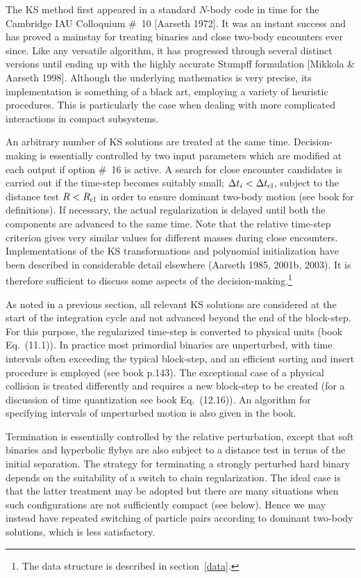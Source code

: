 \documentclass[12pt]{article}
\begin{document}
The KS method first appeared in a standard $N$-body code in time for the
Cambridge IAU Colloquium \#~10 [Aarseth 1972].
It was an instant success and has proved a mainstay for treating binaries
and close two-body encounters ever since.
Like any versatile algorithm, it has progressed through several distinct
versions until ending up with the highly accurate Stumpff formulation
[Mikkola \& Aarseth 1998].
Although the underlying mathematics is very precise, its implementation is
something of a black art, employing a variety of heuristic procedures.
This is particularly the case when dealing with more complicated interactions
in compact subsystems.

An arbitrary number of KS solutions are treated at the same time.
Decision-making is essentially controlled by two input parameters which are
modified at each output if option \#~16 is active.
A search for close encounter candidates is carried out if the time-step
becomes suitably small; \ie ${\Delta t}_i < {\Delta t}_{\rm cl}$,
subject to the distance test $R < R_{\rm cl}$ in order to ensure dominant
two-body motion (see book for definitions).
If necessary, the actual regularization is delayed until both the components
are advanced to the same time.
Note that the relative time-step criterion gives very similar values for
different masses during close encounters.
Implementations of the KS transformations and polynomial initialization have
been described in considerable detail elsewhere (Aarseth 1985, 2001b, 2003).
It is therefore sufficient to discuss some aspects of the
decision-making.\footnote{The data structure is described in
section~\ref{data}.}

As noted in a previous section, all relevant KS solutions are considered
at the start of the integration cycle and not advanced beyond the end of the
block-step.
For this purpose, the regularized time-step is converted to physical units
(book Eq.~(11.1)).
In practice most primordial binaries are unperturbed, with time intervals
often exceeding the typical block-step, and an efficient sorting and insert
procedure is employed (see book p.143).
The exceptional case of a physical collision is treated differently and
requires a new block-step to be created (for a discussion of time
quantization see book Eq.~(12.16)).
An algorithm for specifying intervals of unperturbed motion is also given in
the book.

Termination is essentially controlled by the relative perturbation, except
that soft binaries and hyperbolic flybys are also subject to a distance test
in terms of the initial separation.
The strategy for terminating a strongly perturbed hard binary depends on the
suitability of a switch to chain regularization.
The ideal case is that the latter treatment may be adopted but there are many
situations when such configurations are not sufficiently compact (see below).
Hence we may instead have repeated switching of particle pairs according to
dominant two-body solutions, which is less satisfactory.
\end{document}

